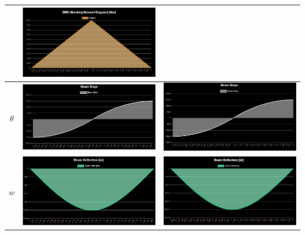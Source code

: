 \documentclass{jsarticle}
\begin{document}
\begin{table}[H]
\begin{center}
\begin{tabular}{|c|c|c|}
\begin{minipage}{6truecm}
\end{minipage}
&
\begin{minipage}{6truecm}
\centering
\includegraphics[width=6cm]{simple_one_model_FDM_bm.PNG}
\end{minipage}
\\
\hline
$\theta$ &
\begin{minipage}{6truecm}
\centering
\includegraphics[width=6cm]{simple_one_model_FEM_slo.PNG}
\end{minipage}
&
\begin{minipage}{6truecm}
\centering
\includegraphics[width=6cm]{simple_one_model_FDM_slo.PNG}
\end{minipage}
\\
\hline
$w$ &
\begin{minipage}{6truecm}
\centering
\includegraphics[width=6cm]{simple_one_model_FEM_def.PNG}
\end{minipage}
&
\begin{minipage}{6truecm}
\centering
\includegraphics[width=6cm]{simple_one_model_FDM_def.PNG}
\end{minipage}
\\
\hline
\end{tabular}
\end{center}
\end{table}
\end{document}
